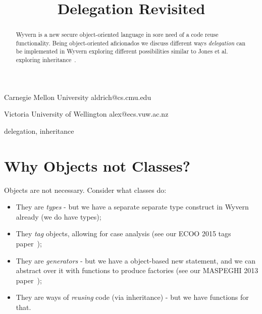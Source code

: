 \documentclass[preprint]{sigplanconf}
\begin{document}
\setlength{\pdfpageheight}{\paperheight}
\setlength{\pdfpagewidth}{\paperwidth}




\title{Delegation Revisited}

           {Carnegie Mellon University}
           {aldrich@cs.cmu.edu}

           {Victoria University of Wellington}
           {alex@ecs.vuw.ac.nz}
		   		   
\maketitle

\begin{abstract}
Wyvern is a new secure object-oriented language in sore need of a code reuse functionality. Being object-oriented aficionados we discuss different ways \textit{delegation} can be implemented in Wyvern exploring different possibilities similar to Jones et al. exploring inheritance~\cite{jones:2016:inheritance}.
\end{abstract}


%

\keywords
delegation, inheritance

\section{Why Objects not Classes?}

Objects are not necessary. Consider what classes do:

\begin{itemize}
\item They are \textit{types} - but we have a separate separate type construct in Wyvern already (we do have types);
\item They \textit{tag} objects, allowing for case analysis (see our ECOO 2015 tags paper~\cite{DBLP:conf/ecoop/LeeASP15});
\item They are \textit{generators} - but we have a object-based new statement, and we can abstract over it with functions to produce factories (see our MASPEGHI 2013 paper~\cite{Nistor:2013:WST:2489828.2489830});
\item They are ways of \textit{reusing} code (via inheritance) - but we have functions for that.
\end{itemize}
\end{document}
